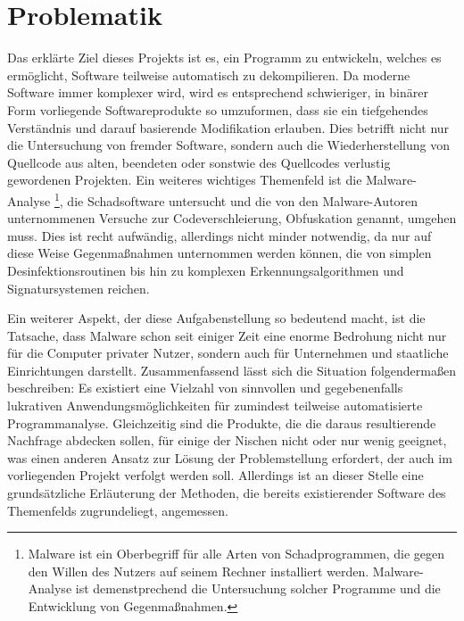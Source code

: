 \documentclass[11pt]{article}
\begin{document}
\section{Problematik}
Das erklärte Ziel dieses Projekts ist es, ein Programm zu entwickeln, welches
es ermöglicht, Software teilweise automatisch zu dekompilieren. Da moderne Software immer komplexer
wird, wird es entsprechend schwieriger, in binärer Form vorliegende Softwareprodukte so umzuformen,
dass sie ein tiefgehendes Verständnis und darauf basierende Modifikation erlauben.
Dies betrifft nicht nur die Untersuchung von fremder Software, sondern auch die Wiederherstellung
von Quellcode aus alten, beendeten oder sonstwie des Quellcodes verlustig gewordenen Projekten.
Ein weiteres wichtiges Themenfeld ist die Malware-Analyse
\footnote{
	Malware ist ein Oberbegriff für alle Arten von Schadprogrammen, die gegen den Willen des Nutzers
	auf seinem Rechner installiert werden. Malware-Analyse ist demenstprechend die Untersuchung solcher
	Programme und die Entwicklung von Gegenmaßnahmen.},
die Schadsoftware untersucht und die von
den Malware-Autoren unternommenen Versuche zur Codeverschleierung, Obfuskation genannt, umgehen muss.
Dies ist recht aufwändig, allerdings nicht minder notwendig, da nur auf diese Weise Gegenmaßnahmen unternommen
werden können, die von simplen Desinfektionsroutinen bis hin zu komplexen Erkennungsalgorithmen und
Signatursystemen reichen.

Ein weiterer Aspekt, der diese Aufgabenstellung so bedeutend macht, ist die Tatsache,
dass Malware schon seit einiger Zeit eine enorme Bedrohung nicht nur für die Computer privater Nutzer, sondern
auch für Unternehmen und staatliche Einrichtungen darstellt. Zusammenfassend lässt sich die Situation
folgendermaßen beschreiben: Es existiert eine Vielzahl von sinnvollen und gegebenenfalls lukrativen
Anwendungsmöglichkeiten für zumindest teilweise automatisierte Programmanalyse. Gleichzeitig sind die
Produkte, die die daraus resultierende Nachfrage abdecken sollen, für einige der Nischen nicht oder nur
wenig geeignet, was einen anderen Ansatz zur Lösung der Problemstellung erfordert, der auch im vorliegenden
Projekt verfolgt werden soll. Allerdings ist an dieser Stelle eine grundsätzliche Erläuterung der Methoden,
die bereits existierender Software des Themenfelds zugrundeliegt, angemessen.
\end{document}
